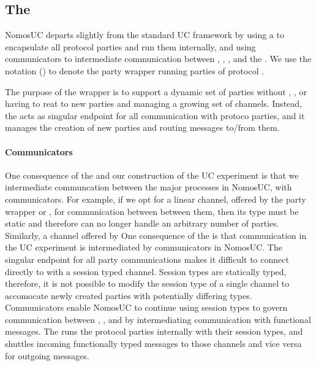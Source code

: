 

\subsection{The \partywrapper}
NomosUC departs slightly from the standard UC framework by using a \partywrapper to encapsulate all protocol parties and run them internally, and using communicators to intermediate communication between \Z, \A, \F, and the \partywrapper.
We use the notation (\PI) to denote the party wrapper running parties of protocol \PI.

The purpose of the wrapper is to support a dynamic set of parties without \Z, \A, or \F having to reat to new parties and managing a growing set of channels.
Instead, the \partywrapper acts as singular endpoint for all communication with protoco parties, and it manages the creation of new parties and routing messages to/from them.

\paragraph{Communicators}
One consequence of the \partywrapper and our construction of the UC experiment is that we intermediate communcation between the major processes in NomosUC, with communicators.
For example, if we opt for a linear channel, offered by the party wrapper or \Z, for communication between between them, then its type must be static and therefore can no longer handle an arbitrary number of parties.
Similarly, a channel offered by
One consequence of the \partywrapper is that communication in the UC experiment is intermediated by communicators in NomosUC.
The singular endpoint for all party communications makes it difficult to connect \pw directly to \Z with a session typed channel.
Session types are statically typed, therefore, it is not possible to modify the session type of a single channel to accomocate newly created parties with potentially differing types. 
Communicators enable NomosUC to continue using session types to govern communication between \Z, \PI, and \F by intermediating communication with functional messages.
The \pw runs the protocol parties internally with their session types, and shuttles incoming functionally typed messages to those channels and vice versa for outgoing messages.

